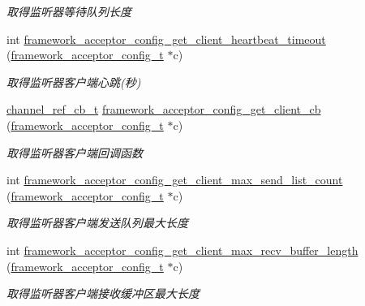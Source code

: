 \begin{DoxyCompactItemize}
\begin{DoxyCompactList}\small\item\em 取得监听器等待队列长度 \end{DoxyCompactList}\item 
int \hyperlink{a00054_a69627295fbc0455a27fc5f072fbec3f6_a69627295fbc0455a27fc5f072fbec3f6}{framework\+\_\+acceptor\+\_\+config\+\_\+get\+\_\+client\+\_\+heartbeat\+\_\+timeout} (\hyperlink{a00050_a61a4e424ff4c86631423dedd97c40064_a61a4e424ff4c86631423dedd97c40064}{framework\+\_\+acceptor\+\_\+config\+\_\+t} $\ast$c)
\begin{DoxyCompactList}\small\item\em 取得监听器客户端心跳(秒) \end{DoxyCompactList}\item 
\hyperlink{a00050_ae296ec4d1ce108960de8dcc423956a1d_ae296ec4d1ce108960de8dcc423956a1d}{channel\+\_\+ref\+\_\+cb\+\_\+t} \hyperlink{a00054_ac7701d809c6474d8e606d224b8f63259_ac7701d809c6474d8e606d224b8f63259}{framework\+\_\+acceptor\+\_\+config\+\_\+get\+\_\+client\+\_\+cb} (\hyperlink{a00050_a61a4e424ff4c86631423dedd97c40064_a61a4e424ff4c86631423dedd97c40064}{framework\+\_\+acceptor\+\_\+config\+\_\+t} $\ast$c)
\begin{DoxyCompactList}\small\item\em 取得监听器客户端回调函数 \end{DoxyCompactList}\item 
int \hyperlink{a00054_abbc66fe7a78fe5ecc57377558578fdb9_abbc66fe7a78fe5ecc57377558578fdb9}{framework\+\_\+acceptor\+\_\+config\+\_\+get\+\_\+client\+\_\+max\+\_\+send\+\_\+list\+\_\+count} (\hyperlink{a00050_a61a4e424ff4c86631423dedd97c40064_a61a4e424ff4c86631423dedd97c40064}{framework\+\_\+acceptor\+\_\+config\+\_\+t} $\ast$c)
\begin{DoxyCompactList}\small\item\em 取得监听器客户端发送队列最大长度 \end{DoxyCompactList}\item 
int \hyperlink{a00054_a57338d58973436dba20f7e264784302d_a57338d58973436dba20f7e264784302d}{framework\+\_\+acceptor\+\_\+config\+\_\+get\+\_\+client\+\_\+max\+\_\+recv\+\_\+buffer\+\_\+length} (\hyperlink{a00050_a61a4e424ff4c86631423dedd97c40064_a61a4e424ff4c86631423dedd97c40064}{framework\+\_\+acceptor\+\_\+config\+\_\+t} $\ast$c)
\begin{DoxyCompactList}\small\item\em 取得监听器客户端接收缓冲区最大长度 \end{DoxyCompactList}\item 

\end{DoxyCompactItemize}
